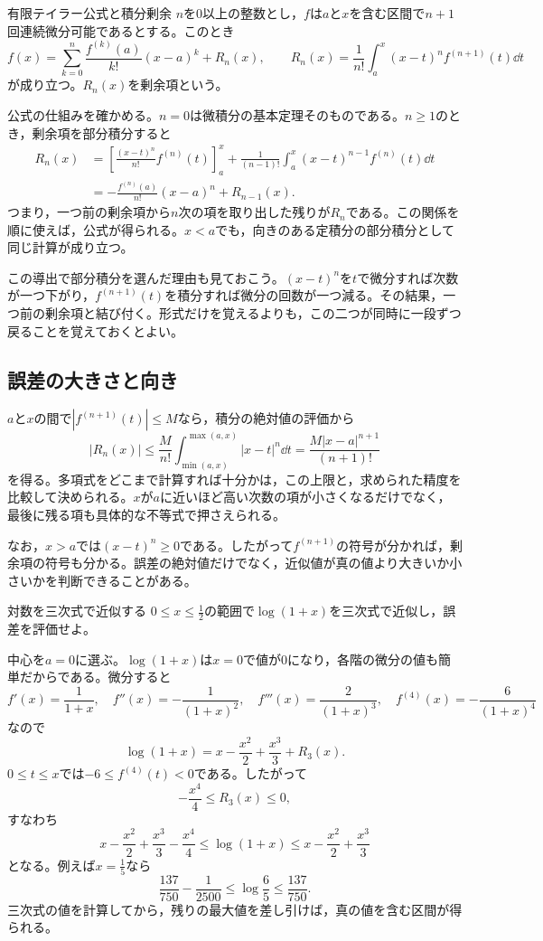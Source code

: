 \begin{theorem}{有限テイラー公式と積分剰余}
$n$を$0$以上の整数とし，$f$は$a$と$x$を含む区間で$n+1$回連続微分可能であるとする。このとき
\[
 f(x)=\sum_{k=0}^{n}\frac{f^{(k)}(a)}{k!}(x-a)^k+R_n(x),
 \qquad
 R_n(x)=\frac{1}{n!}\int_a^x(x-t)^n f^{(n+1)}(t)\dd t
\]
が成り立つ。$R_n(x)$を剰余項という。
\end{theorem}

公式の仕組みを確かめる。$n=0$は微積分の基本定理そのものである。$n\geq1$のとき，剰余項を部分積分すると
\[
\begin{aligned}
 R_n(x)
 &=\left[\frac{(x-t)^n}{n!}f^{(n)}(t)\right]_a^x
   +\frac{1}{(n-1)!}\int_a^x(x-t)^{n-1}f^{(n)}(t)\dd t\\
 &=-\frac{f^{(n)}(a)}{n!}(x-a)^n+R_{n-1}(x).
\end{aligned}
\]
つまり，一つ前の剰余項から$n$次の項を取り出した残りが$R_n$である。この関係を順に使えば，公式が得られる。$x<a$でも，向きのある定積分の部分積分として同じ計算が成り立つ。

この導出で部分積分を選んだ理由も見ておこう。$(x-t)^n$を$t$で微分すれば次数が一つ下がり，$f^{(n+1)}(t)$を積分すれば微分の回数が一つ減る。その結果，一つ前の剰余項と結び付く。形式だけを覚えるよりも，この二つが同時に一段ずつ戻ることを覚えておくとよい。

\subsection{誤差の大きさと向き}

$a$と$x$の間で$|f^{(n+1)}(t)|\leq M$なら，積分の絶対値の評価から
\[
 |R_n(x)|\leq\frac{M}{n!}\int_{\min(a,x)}^{\max(a,x)}|x-t|^n\dd t
 =\frac{M|x-a|^{n+1}}{(n+1)!}
\]
を得る。多項式をどこまで計算すれば十分かは，この上限と，求められた精度を比較して決められる。$x$が$a$に近いほど高い次数の項が小さくなるだけでなく，最後に残る項も具体的な不等式で押さえられる。

なお，$x>a$では$(x-t)^n\geq0$である。したがって$f^{(n+1)}$の符号が分かれば，剰余項の符号も分かる。誤差の絶対値だけでなく，近似値が真の値より大きいか小さいかを判断できることがある。

\begin{example}{対数を三次式で近似する}
$0\leq x\leq\frac12$の範囲で$\log(1+x)$を三次式で近似し，誤差を評価せよ。
\end{example}

中心を$a=0$に選ぶ。$\log(1+x)$は$x=0$で値が$0$になり，各階の微分の値も簡単だからである。微分すると
\[
 f'(x)=\frac{1}{1+x},\quad
 f''(x)=-\frac{1}{(1+x)^2},\quad
 f'''(x)=\frac{2}{(1+x)^3},\quad
 f^{(4)}(x)=-\frac{6}{(1+x)^4}
\]
なので
\[
 \log(1+x)=x-\frac{x^2}{2}+\frac{x^3}{3}+R_3(x).
\]
$0\leq t\leq x$では$-6\leq f^{(4)}(t)<0$である。したがって
\[
 -\frac{x^4}{4}\leq R_3(x)\leq0,
\]
すなわち
\[
 x-\frac{x^2}{2}+\frac{x^3}{3}-\frac{x^4}{4}
 \leq\log(1+x)
 \leq x-\frac{x^2}{2}+\frac{x^3}{3}
\]
となる。例えば$x=\frac15$なら
\[
 \frac{137}{750}-\frac{1}{2500}
 \leq\log\frac65\leq\frac{137}{750}.
\]
三次式の値を計算してから，残りの最大値を差し引けば，真の値を含む区間が得られる。

